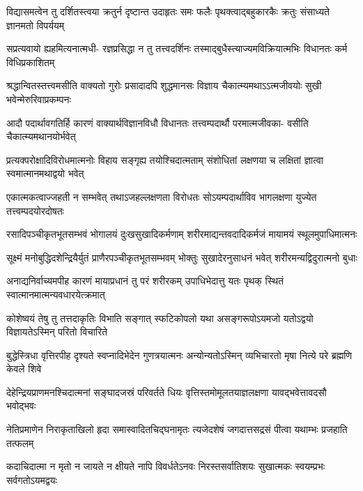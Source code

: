 \fourlineindentedshloka
{विद्यासमत्वेन तु दर्शितस्त्वया}
{क्रतुर्न दृष्टान्त उदाहृतः समः}
{फलैः पृथक्त्वाद्बहुकारकैः क्रतुः}
{संसाध्यते ज्ञानमतो विपर्ययम्} %

\fourlineindentedshloka
{सप्रत्यवायो ह्यहमित्यनात्मधी-}
{रज्ञप्रसिद्धा न तु तत्त्वदर्शिनः}
{तस्माद्बुधैस्त्याज्यमविक्रियात्मभिः}
{विधानतः कर्म विधिप्रकाशितम्} %

\fourlineindentedshloka
{श्रद्धान्वितस्तत्त्वमसीति वाक्यतो}
{गुरोः प्रसादादपि शुद्धमानसः}
{विज्ञाय चैकात्म्यमथाऽऽत्मजीवयोः}
{सुखी भवेन्मेरुरिवाप्रकम्पनः} %

\fourlineindentedshloka
{आदौ पदार्थावगतिर्हि कारणं}
{वाक्यार्थविज्ञानविधौ विधानतः}
{तत्त्वम्पदार्थौ परमात्मजीवका-}
{वसीति चैकात्म्यमथानयोर्भवेत्} %

\fourlineindentedshloka
{प्रत्यक्परोक्षादिविरोधमात्मनोः}
{विहाय सङ्गृह्य तयोश्चिदात्मताम्}
{संशोधितां लक्षणया च लक्षितां}
{ज्ञात्वा स्वमात्मानमथाद्वयो भवेत्} %

\fourlineindentedshloka
{एकात्मकत्वाज्जहती न सम्भवेत्}
{तथाऽजहल्लक्षणता विरोधतः}
{सोऽयम्पदार्थाविव भागलक्षणा}
{युज्येत तत्त्वम्पदयोरदोषतः} %

\fourlineindentedshloka
{रसादिपञ्चीकृतभूतसम्भवं}
{भोगालयं दुःखसुखादिकर्मणाम्}
{शरीरमाद्यन्तवदादिकर्मजं}
{मायामयं स्थूलमुपाधिमात्मनः} %

\fourlineindentedshloka
{सूक्ष्मं मनोबुद्धिदशेन्द्रियैर्युतं}
{प्राणैरपञ्चीकृतभूतसम्भवम्}
{भोक्तुः सुखादेरनुसाधनं भवेत्}
{शरीरमन्यद्विदुरात्मनो बुधाः} %

\fourlineindentedshloka
{अनाद्यनिर्वाच्यमपीह कारणं}
{मायाप्रधानं तु परं शरीरकम्}
{उपाधिभेदात्तु यतः पृथक् स्थितं}
{स्वात्मानमात्मन्यवधारयेत्क्रमात्} %

\fourlineindentedshloka
{कोशेष्वयं तेषु तु तत्तदाकृतिः}
{विभाति सङ्गात् स्फटिकोपलो यथा}
{असङ्गरूपोऽयमजो यतोऽद्वयो}
{विज्ञायतेऽस्मिन् परितो विचारिते} %

\fourlineindentedshloka
{बुद्धेस्त्रिधा वृत्तिरपीह दृश्यते}
{स्वप्नादिभेदेन गुणत्रयात्मनः}
{अन्योन्यतोऽस्मिन् व्यभिचारतो मृषा}
{नित्ये परे ब्रह्मणि केवले शिवे} %

\fourlineindentedshloka
{देहेन्द्रियप्राणमनश्चिदात्मनां}
{सङ्घादजस्रं परिवर्तते धियः}
{वृत्तिस्तमोमूलतयाज्ञलक्षणा}
{यावद्भवेत्तावदसौ भवोद्भवः} %

\fourlineindentedshloka
{नेतिप्रमाणेन निराकृताखिलो}
{हृदा समास्वादितचिद्घनामृतः}
{त्यजेदशेषं जगदात्तसद्रसं}
{पीत्वा यथाम्भः प्रजहाति तत्फलम्} %

\fourlineindentedshloka
{कदाचिदात्मा न मृतो न जायते}
{न क्षीयते नापि विवर्धतेऽनवः}
{निरस्तसर्वातिशयः सुखात्मकः}
{स्वयम्प्रभः सर्वगतोऽयमद्वयः} %

